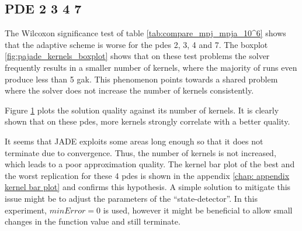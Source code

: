 \documentclass[./\jobname.tex]{subfiles}
\begin{document}
\subsection{PDE 2 3 4 7}
\label{chap:pde 2 3 4 7}
The Wilcoxon significance test of table \ref{tab:compare_mpj_mpja_10^6} shows that the adaptive scheme is worse for the \gls{pde}s 2, 3, 4 and 7. The boxplot \ref{fig:pajade_kernels_boxplot} shows that on these test problems the solver frequently results in a smaller number of kernels, where the majority of runs even produce less than 5 \gls{gak}. This phenomenon points towards a shared problem where the solver does not increase the number of kernels consistently. 

Figure \ref{fig:pajade_pde2347_kernels_l2norm} plots the solution quality against its number of kernels. It is clearly shown that on these \gls{pde}s, more kernels strongly correlate with a better quality. 

\begin{figure}[H]
	\centering
	\noindent{}
	\label{fig:pajade_pde2347_kernels_l2norm}
\end{figure}

It seems that JADE exploits some areas long enough so that it does not terminate due to convergence. Thus, the number of kernels is not increased, which leads to a poor approximation quality. The kernel bar plot of the best and the worst replication for these 4 \gls{pde}s is shown in the appendix \ref{chap: appendix kernel bar plot} and confirms this hypothesis. A simple solution to mitigate this issue might be to adjust the parameters of the ``state-detector''. In this experiment, $minError = 0$ is used, however it might be beneficial to allow small changes in the function value and still terminate. 
\end{document}
